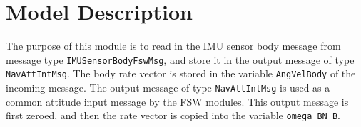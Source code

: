 
\section{Model Description}

The purpose of this module is to read in the IMU sensor body message from message type {\tt IMUSensorBodyFswMsg}, and store it in the output message of type {\tt NavAttIntMsg}.  The body rate vector is stored in the variable {\tt AngVelBody} of the incoming message.  The output message of type {\tt NavAttIntMsg} is used as a common attitude input message by the FSW modules.  This output message is first zeroed, and then the rate vector is copied into the variable {\tt omega\_BN\_B}. 
